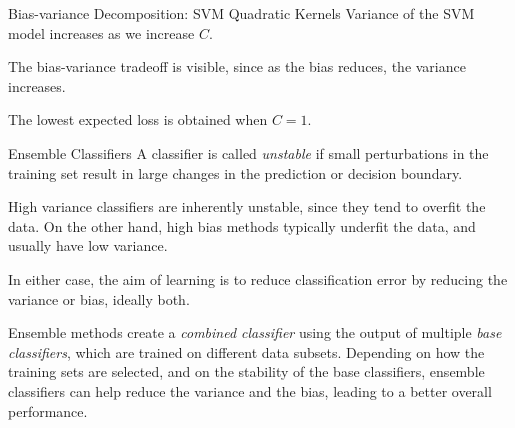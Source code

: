 \begin{frame}[fragile]{Bias-variance Decomposition: SVM Quadratic Kernels}
\small
Variance of the SVM model increases as we increase $C$.

\medskip

The bias-variance tradeoff is visible,
since as the bias reduces, the variance increases.  

\medskip

The lowest expected loss is obtained when $C=1$.
\end{frame}

\ifdefined\wox \begin{frame} \titlepage \end{frame} \fi

\begin{frame}{Ensemble Classif\/{i}ers}
A classif\/{i}er is called {\em unstable} if small perturbations in the
training set result in large changes in the prediction or decision
boundary. 

\medskip
High variance classif\/{i}ers are inherently unstable, since they
tend to overf\/{i}t the data.
On the other hand, high bias methods typically underf\/{i}t the data, and usually have
low variance.

\medskip
In either case, the aim of learning is to reduce classif\/{i}cation
error by reducing the variance or bias, ideally both.

\medskip
Ensemble methods create a {\em combined classif\/{i}er} using the
output of multiple {\em base classif\/{i}ers}, which are
trained on different data subsets. Depending on how the training
sets are selected, and on the stability of the base classif\/{i}ers,
ensemble classif\/{i}ers can help reduce the variance and the bias, leading
to a better overall performance.
\end{frame}



